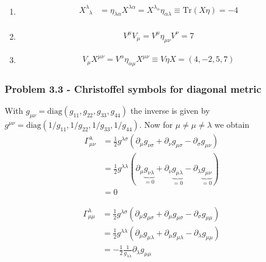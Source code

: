 \documentclass[10pt,a4paper]{book}
\theoremstyle{definition}
\begin{document}
\begin{enumerate}
\item 
\begin{align}
 X^\lambda_{\;\;\lambda}&=\eta_{\lambda\alpha}X^{\lambda\alpha}=X^{\lambda_\alpha}\eta_{\alpha\lambda}\equiv  \text{Tr}(X\eta)=-4\\
\end{align}

\item 
\begin{align}
V^\mu V_\mu = V^\mu \eta_{\mu\nu}V^\nu=7
\end{align}

\item 
\begin{align}
V_\mu X^{\mu\nu} = V^\alpha\eta_{\alpha\mu} X^{\mu\nu}\equiv V\eta X=(4,-2,5,7)
\end{align}
\end{enumerate}


\subsubsection{Problem 3.3 - Christoffel symbols for diagonal metric}
With $g_{\mu\nu}=\text{diag}(g_{11},g_{22},g_{33},g_{44})$ the inverse is given by $g^{\mu\nu}=\text{diag}(1/g_{11},1/g_{22},1/g_{33},1/g_{44})$. Now for $\mu\neq\mu\neq\lambda$ we obtain
\begin{align}
\Gamma^\lambda_{\mu\nu}
&=\frac{1}{2}g^{\lambda\sigma}(\partial_\mu g_{\nu\sigma}+\partial_\nu g_{\mu\sigma}-\partial_\sigma g_{\mu\nu})\\
&=\frac{1}{2}g^{\lambda\lambda}(\partial_\mu \underbrace{g_{\nu\lambda}}_{=0}+\partial_\nu \underbrace{g_{\mu\lambda}}_{=0}-\partial_\lambda \underbrace{g_{\mu\nu}}_{=0})\\
&=0
\end{align}

\begin{align}
\Gamma^\lambda_{\mu\mu}
&=\frac{1}{2}g^{\lambda\sigma}(\partial_\mu g_{\mu\sigma}+\partial_\mu g_{\mu\sigma}-\partial_\sigma g_{\mu\mu})\\
&=\frac{1}{2}g^{\lambda\lambda}(\partial_\mu g_{\mu\lambda}+\partial_\mu g_{\mu\lambda}-\partial_\lambda g_{\mu\mu})\\
&=-\frac{1}{2}\frac{1}{g_{\lambda\lambda}}\partial_\lambda g_{\mu\mu}
\end{align}
\end{document}
